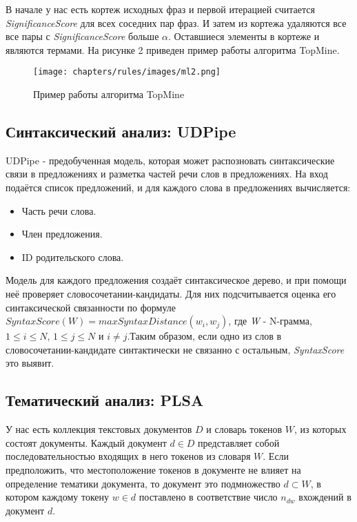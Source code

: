 В начале у нас есть кортеж исходных фраз и первой итерацией считается \textit{SignificanceScore} для всех соседних пар фраз. И затем из кортежа удаляются все все пары с \textit{SignificanceScore} больше $\alpha$. Оставшиеся элементы в кортеже и являются термами. На рисунке 2 приведен пример работы алгоритма TopMine.
\begin{figure}
    \texttt{[image: chapters/rules/images/ml2.png]}
    \caption{Пример работы алгоритма TopMine}
\end{figure}
\subsection*{Синтаксический анализ: UDPipe}

UDPipe - предобученная модель, которая может распозновать синтаксические связи в предложениях и разметка частей речи слов в предложениях. На вход подаётся список предложений, и для каждого слова в предложениях вычисляется:

\begin{itemize}
	\item Часть речи слова.
	\item Член предложения.
	\item ID родительского слова.
\end{itemize}

Модель для каждого предложения создаёт синтаксическое дерево, и при помощи неё проверяет словосочетании-кандидаты. Для них подсчитывается оценка его синтаксической связанности по формуле $SyntaxScore(W) = max SyntaxDistance(w_{i}, w_{j})$, где \textit{W} - N-грамма, $1 \leq i \leq N$, $1 \leq j \leq N$ и $i \neq j$.Таким образом, если одно из слов в словосочетании-кандидате синтактически не связанно с остальным, \textit{SyntaxScore} это выявит.

\subsection*{Тематический анализ: PLSA}

У нас есть коллекция текстовых документов $D$ и словарь токенов $W$, из которых состоят документы. Каждый документ $d \in D$ представляет собой последовательностью входящих в него токенов из словаря $W$. Если предположить, что местоположение токенов в документе не влияет на определение тематики документа, то документ это подмножество $d \subset W$, в котором каждому токену $w \in d$ поставлено в соответствие число $n_{dw}$ вхождений в документ $d$.


